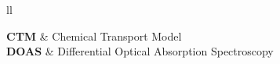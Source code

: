 \begin{abbreviations}{ll} %

\textbf{CTM} & Chemical Transport Model \\
\textbf{DOAS} & Differential Optical Absorption Spectroscopy \\

\end{abbreviations}